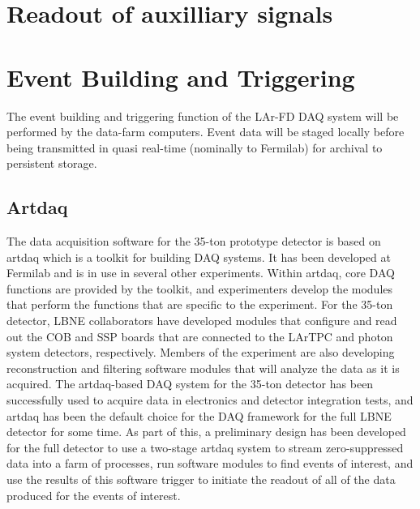 \section{Readout of auxilliary signals}
\label{sec:daq_penn}


\section{Event Building and Triggering}
\label{sec:daq_artDAQ}

The event building and triggering function of the LAr-FD DAQ system 
will be performed by the data-farm computers.  Event data will be staged 
locally before being transmitted in quasi real-time (nominally to Fermilab) 
for archival to persistent storage. 

\subsection{Artdaq}

The data acquisition software for the 35-ton prototype detector is
based on artdaq which is a toolkit for building DAQ systems.  It has
been developed at Fermilab and is in use in several other experiments.
Within artdaq, core DAQ functions are provided by the toolkit, and
experimenters develop the modules that perform the functions that are
specific to the experiment.  For the 35-ton detector, LBNE
collaborators have developed modules that configure and read out the
COB and SSP boards that are connected to the LArTPC and photon system
detectors, respectively.  Members of the experiment are also
developing reconstruction and filtering software modules that will
analyze the data as it is acquired.  The artdaq-based DAQ system for
the 35-ton detector has been successfully used to acquire data in
electronics and detector integration tests, and artdaq has been the
default choice for the DAQ framework for the full LBNE detector for
some time.  As part of this, a preliminary design has been developed
for the full detector to use a two-stage artdaq system to stream
zero-suppressed data into a farm of processes, run software modules to
find events of interest, and use the results of this software trigger
to initiate the readout of all of the data produced for the events of
interest.


